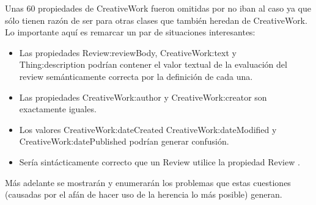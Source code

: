\noindent Unas 60 propiedades de CreativeWork fueron omitidas por no iban al caso ya que sólo tienen razón de ser para otras clases que 
también heredan de CreativeWork. Lo importante aquí es remarcar un par de situaciones interesantes:

\begin{itemize}
 \item Las propiedades Review:reviewBody, CreativeWork:text y \\\noindent Thing:description podrían contener el valor textual de la evaluación del review semánticamente correcta por la definición de cada una.

 \item Las propiedades CreativeWork:author y CreativeWork:creator son exactamente iguales. 

 \item Los valores CreativeWork:dateCreated CreativeWork:dateModified y CreativeWork:datePublished podrían generar confusión. 

 \item Sería sintácticamente correcto que un Review utilice la propiedad Review .
\end{itemize}

Más adelante se mostrarán y enumerarán los problemas que estas cuestiones (causadas por el afán de hacer uso de la herencia
lo más posible)  generan. 
